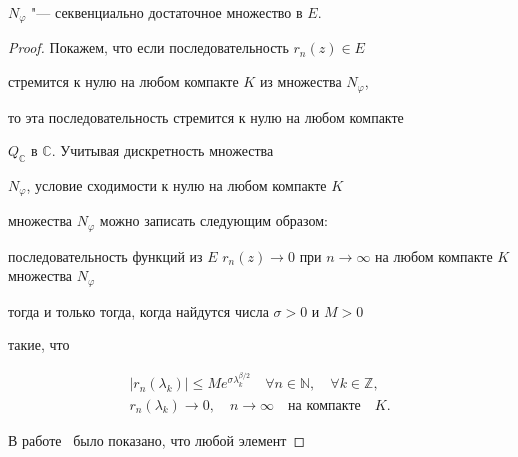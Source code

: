 \smallskip

\pagebreak






\smallskip



\begin{theorem}[5]$N_\varphi$ "--- секвенциально достаточное множество в $E.$

\end{theorem}

\smallskip



\begin{proof} Покажем, что если последовательность $r_n(z)\in E$

стремится к нулю на любом компакте $K$ из  множества $N_\varphi$,

то эта последовательность стремится к нулю на любом компакте

$Q_\mathbb{C}$ в $\mathbb{C}$. Учитывая дискретность множества

$N_\varphi$,  условие сходимости к нулю на любом компакте $K$

множества $N_\varphi$ можно записать следующим образом:

последовательность функций из $ E$  $r_n(z)\to 0$ при $

n\to \infty$ на любом компакте $K$ множества $N_\varphi$

тогда и только тогда, когда найдутся числа $\sigma>0$ и $M>0$

такие, что

\begin{gather}

\label{napal:eq7} \left|r_n(\lambda_k)\right|\leq M

e^{\sigma\lambda_k^{\beta/2}} \quad \forall n\in \mathbb{N},

\quad \forall k\in \mathbb{Z},\\

\label{napal:eq8} r_n(\lambda_k)\to 0, \quad

n \to \infty \quad \text{на компакте} \quad K.

\end{gather}



В работе~\cite[стр.~208]{napal:bib11} было показано, что любой элемент


\end{proof}
